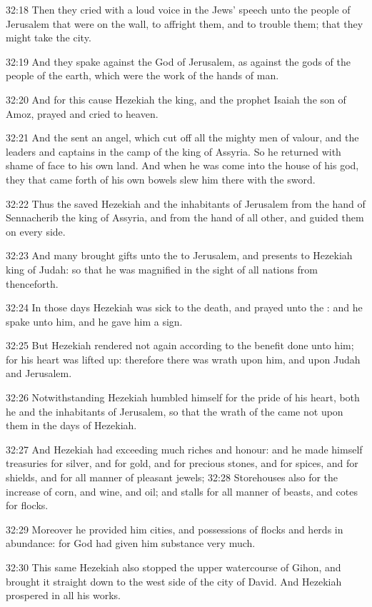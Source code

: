 32:18 Then they cried with a loud voice in the Jews' speech unto the people of Jerusalem that were on the wall, to affright them, and to trouble them; that they might take the city.

32:19 And they spake against the God of Jerusalem, as against the gods of the people of the earth, which were the work of the hands of man.

32:20 And for this cause Hezekiah the king, and the prophet Isaiah the son of Amoz, prayed and cried to heaven.

32:21 And the \LORD sent an angel, which cut off all the mighty men of valour, and the leaders and captains in the camp of the king of Assyria. So he returned with shame of face to his own land. And when he was come into the house of his god, they that came forth of his own bowels slew him there with the sword.

32:22 Thus the \LORD saved Hezekiah and the inhabitants of Jerusalem from the hand of Sennacherib the king of Assyria, and from the hand of all other, and guided them on every side.

32:23 And many brought gifts unto the \LORD to Jerusalem, and presents to Hezekiah king of Judah: so that he was magnified in the sight of all nations from thenceforth.

32:24 In those days Hezekiah was sick to the death, and prayed unto the \LORD: and he spake unto him, and he gave him a sign.

32:25 But Hezekiah rendered not again according to the benefit done unto him; for his heart was lifted up: therefore there was wrath upon him, and upon Judah and Jerusalem.

32:26 Notwithstanding Hezekiah humbled himself for the pride of his heart, both he and the inhabitants of Jerusalem, so that the wrath of the \LORD came not upon them in the days of Hezekiah.

32:27 And Hezekiah had exceeding much riches and honour: and he made himself treasuries for silver, and for gold, and for precious stones, and for spices, and for shields, and for all manner of pleasant jewels; 32:28 Storehouses also for the increase of corn, and wine, and oil; and stalls for all manner of beasts, and cotes for flocks.

32:29 Moreover he provided him cities, and possessions of flocks and herds in abundance: for God had given him substance very much.

32:30 This same Hezekiah also stopped the upper watercourse of Gihon, and brought it straight down to the west side of the city of David.  And Hezekiah prospered in all his works.

